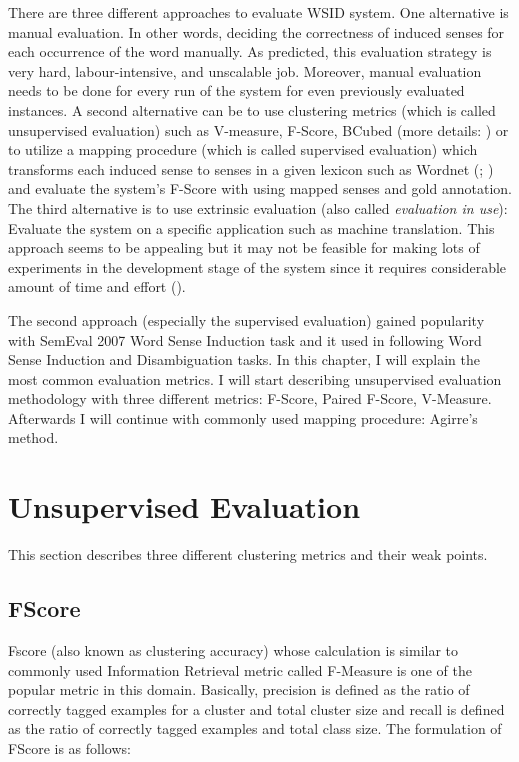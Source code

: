 There are three different approaches to evaluate WSID system. One alternative is manual evaluation. In other words, deciding the correctness of induced senses for each occurrence of the word manually. As predicted, this evaluation strategy is very hard, labour-intensive, and unscalable job. Moreover, manual evaluation needs to be done for every run of the system for even previously evaluated instances. A second alternative can be to use clustering metrics (which is called unsupervised evaluation) such as V-measure, F-Score, BCubed (more details: \cite{amigo09comparison}) or to utilize a mapping procedure (which is called supervised evaluation) which transforms each induced sense to senses in a given lexicon such as Wordnet (\cite{pantel02discovering}; \cite{agirre2006two}) and evaluate the system's F-Score with using mapped senses and gold annotation. The third alternative is to use extrinsic evaluation (also called \emph{evaluation in use}): Evaluate the system on a specific application such as machine translation. This approach seems to be appealing but it may not be feasible for making lots of experiments in the development stage of the system since it requires considerable amount of time and effort (\cite{agirre07semeval}). 

The second approach (especially the supervised evaluation) gained popularity with SemEval 2007 Word Sense Induction task and it used in following Word Sense Induction and Disambiguation tasks. In this chapter, I will explain the most common evaluation metrics. I will start describing unsupervised evaluation methodology with three different metrics: F-Score, Paired F-Score, V-Measure. Afterwards I will continue with commonly used mapping procedure: Agirre's method.


\section{Unsupervised Evaluation}
This section describes three different clustering metrics and their weak points. 
\subsection{FScore}
Fscore (also known as clustering accuracy) whose calculation is similar to commonly used Information Retrieval metric called F-Measure \cite{van1979information} is one of the popular metric in this domain. Basically, precision is defined as the ratio of correctly tagged examples for a cluster and total cluster size and recall is defined as the ratio of correctly tagged examples and total class size. The formulation of FScore is as follows: \\

